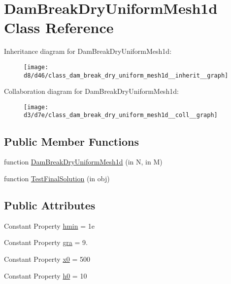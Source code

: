 \hypertarget{class_dam_break_dry_uniform_mesh1d}{}\section{Dam\+Break\+Dry\+Uniform\+Mesh1d Class Reference}
\label{class_dam_break_dry_uniform_mesh1d}


Inheritance diagram for Dam\+Break\+Dry\+Uniform\+Mesh1d\+:
\nopagebreak
\begin{figure}[H]
\begin{center}
\leavevmode
\texttt{[image: d8/d46/class\_dam\_break\_dry\_uniform\_mesh1d\_\_inherit\_\_graph]}
\end{center}
\end{figure}


Collaboration diagram for Dam\+Break\+Dry\+Uniform\+Mesh1d\+:
\nopagebreak
\begin{figure}[H]
\begin{center}
\leavevmode
\texttt{[image: d3/d7e/class\_dam\_break\_dry\_uniform\_mesh1d\_\_coll\_\_graph]}
\end{center}
\end{figure}
\subsection*{Public Member Functions}
\begin{DoxyCompactItemize}
\item 
function \hyperlink{class_dam_break_dry_uniform_mesh1d_a3372f5bcbdb1876cc38c636403df4434}{Dam\+Break\+Dry\+Uniform\+Mesh1d} (in N, in M)
\item 
function \hyperlink{class_dam_break_dry_uniform_mesh1d_acdc6ef9a7205bbbb163fb5a48ac753ac}{Test\+Final\+Solution} (in obj)
\end{DoxyCompactItemize}
\subsection*{Public Attributes}
\begin{DoxyCompactItemize}
\item 
Constant Property \hyperlink{class_dam_break_dry_uniform_mesh1d_a15f12736052b6387b532607f2096b6ac}{hmin} = 1e
\item 
Constant Property \hyperlink{class_dam_break_dry_uniform_mesh1d_a710564d65600a2bc0271b3a570bf0abb}{gra} = 9.
\item 
Constant Property \hyperlink{class_dam_break_dry_uniform_mesh1d_ae7d744682921a6dadd123e97698266db}{x0} = 500
\item 
Constant Property \hyperlink{class_dam_break_dry_uniform_mesh1d_a45901b57f3bd8de348e1d8fb6de515c6}{h0} = 10
\end{DoxyCompactItemize}
